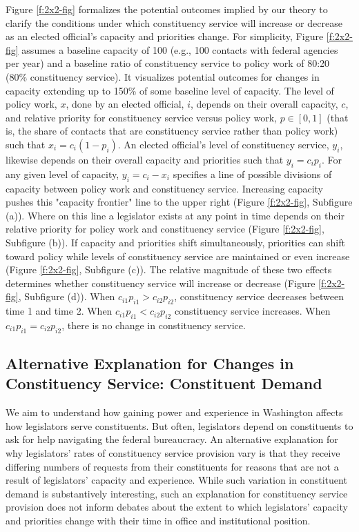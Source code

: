 \documentclass[12pt]{article}
\begin{document}
Figure \ref{f:2x2-fig} formalizes the potential outcomes implied by our theory to clarify the conditions under which constituency service will increase or decrease as an elected official's capacity and priorities change. 
For simplicity, Figure \ref{f:2x2-fig} assumes a baseline capacity of 100 (e.g., 100 contacts with federal agencies per year) and a baseline ratio of constituency service to policy work of 80:20 (80\% constituency service). It visualizes potential outcomes for changes in capacity extending up to 150\% of some baseline level of capacity.
The level of policy work, $x$, done by an elected official, $i$, depends on their overall capacity, $c$, and relative priority for constituency service versus policy work, $p \in [0, 1]$ (that is, the share of contacts that are constituency service rather than policy work) such that $x_i = c_i (1-p_i)$.
An elected official's level of constituency service, $y_i$, likewise depends on their overall capacity and priorities such that $y_i = c_i p_i$.
For any given level of capacity, $y_i = c_i-x_i$ specifies a line of possible divisions of capacity between policy work and constituency service. Increasing capacity pushes this "capacity frontier" line to the upper right (Figure \ref{f:2x2-fig}, Subfigure (a)). Where on this line a legislator exists at any point in time depends on their relative priority for policy work and constituency service (Figure \ref{f:2x2-fig}, Subfigure (b)). If capacity and priorities shift simultaneously, priorities can shift toward policy while levels of constituency service are maintained or even increase (Figure \ref{f:2x2-fig}, Subfigure (c)). The relative magnitude of these two effects determines whether constituency service will increase or decrease (Figure \ref{f:2x2-fig}, Subfigure (d)).  
When $c_{i1}p_{i1} > c_{i2}p_{i2}$, constituency service decreases between time 1 and time 2. 
When $c_{i1}p_{i1} < c_{i2}p_{i2}$ constituency service increases. 
When $c_{i1}p_{i1} = c_{i2}p_{i2}$, there is no change in constituency service. 

\subsection{Alternative Explanation for Changes in Constituency Service: Constituent Demand}

We aim to understand how gaining power and experience in Washington affects how legislators serve constituents. But often, legislators depend on constituents to ask for help navigating the federal bureaucracy. An alternative explanation for why legislators' rates of constituency service provision vary is that they receive differing numbers of requests from their constituents for reasons that are not a result of legislators' capacity and experience. While such variation in constituent demand is substantively interesting, such an explanation for constituency service provision does not inform debates about the extent to which legislators' capacity and priorities change with their time in office and institutional position. 
\end{document}
